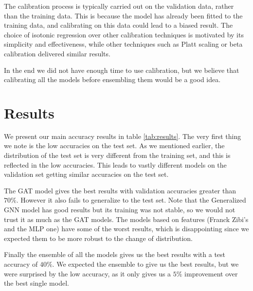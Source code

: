 \documentclass[switch, 11pt]{article}
\begin{document}
\begin{multicols}{2}
    The calibration process is typically carried out on the validation data, rather than the training data. This is because the model has already been fitted to the training data, and calibrating on this data could lead to a biased result. The choice of isotonic regression over other calibration techniques is motivated by its simplicity and effectiveness, while other techniques such as Platt scaling or beta calibration delivered similar results.

    In the end we did not have enough time to use calibration, but we believe that calibrating all the models before ensembling them would be a good idea.

    \section{Results}
    We present our main accuracy results in table \ref{tab:results}. The very first thing we note is the low accuracies on the test set. As we mentioned earlier, the distribution of the test set is very different from the training set, and this is reflected in the low accuracies. This leads to vastly different models on the validation set getting similar accuracies on the test set.

    The GAT model gives the best results with validation accuracies greater than $70\%$. However it also fails to generalize to the test set. Note that the Generalized GNN model has good results but its training was not stable, so we would not trust it as much as the GAT models. The models based on features (Franck Zibi's and the MLP one) have some of the worst results, which is disappointing since we expected them to be more robust to the change of distribution.

    Finally the ensemble of all the models gives us the best results with a test accuracy of $40\%$. We expected the ensemble to give us the best results, but we were surprised by the low accuracy, as it only gives us a $5\%$ improvement over the best single model.


\end{multicols}
\end{document}
